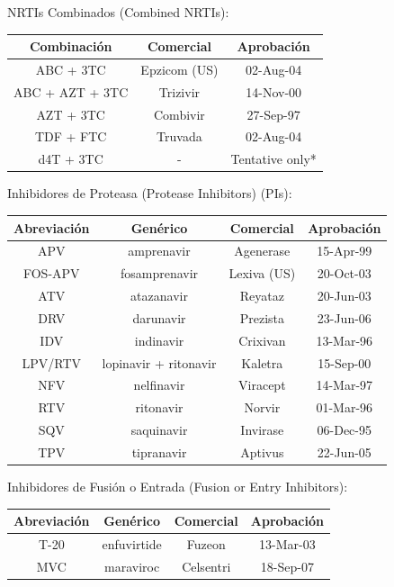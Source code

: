   NRTIs Combinados (Combined NRTIs):

  \begin{center}
    \begin{tabular}{|c|c|c|}
      \hline Combinaci\'on & Comercial & Aprobaci\'on \\ 
      \hline ABC + 3TC & Epzicom (US) & 02-Aug-04  \\ 
      \hline ABC + AZT + 3TC & Trizivir & 14-Nov-00 \\ 
      \hline AZT + 3TC & Combivir & 27-Sep-97  \\ 
      \hline TDF + FTC & Truvada & 02-Aug-04  \\ 
      \hline d4T + 3TC & - & Tentative only*  \\ 
      \hline 
    \end{tabular}
  \end{center}

  Inhibidores de Proteasa (Protease Inhibitors) (PIs):

  \begin{center}
    \begin{tabular}{|c|c|c|c|}
      \hline Abreviaci\'on & Gen\'erico & Comercial & Aprobaci\'on \\
      \hline APV & amprenavir & Agenerase & 15-Apr-99  \\ 
      \hline FOS-APV & fosamprenavir & Lexiva (US) & 20-Oct-03 \\ 
      \hline ATV & atazanavir & Reyataz & 20-Jun-03 \\ 
      \hline DRV & darunavir & Prezista & 23-Jun-06 \\ 
      \hline IDV & indinavir & Crixivan & 13-Mar-96 \\ 
      \hline LPV/RTV & lopinavir + ritonavir & Kaletra & 15-Sep-00 \\ 
      \hline NFV & nelfinavir & Viracept & 14-Mar-97	 \\ 
      \hline RTV & ritonavir & Norvir & 01-Mar-96 \\ 
      \hline SQV & saquinavir & Invirase & 06-Dec-95 \\ 
      \hline TPV & tipranavir & Aptivus & 22-Jun-05 \\ 
      \hline 
    \end{tabular} 
  \end{center}

  Inhibidores de Fusi\'on o Entrada (Fusion or Entry Inhibitors):

  \begin{center}
    \begin{tabular}{|c|c|c|c|}
      \hline Abreviaci\'on & Gen\'erico & Comercial & Aprobaci\'on \\ 
      \hline T-20	& enfuvirtide &	Fuzeon & 13-Mar-03  \\ 
      \hline MVC & maraviroc &Celsentri & 18-Sep-07 \\ 
      \hline 
    \end{tabular}
  \end{center}


